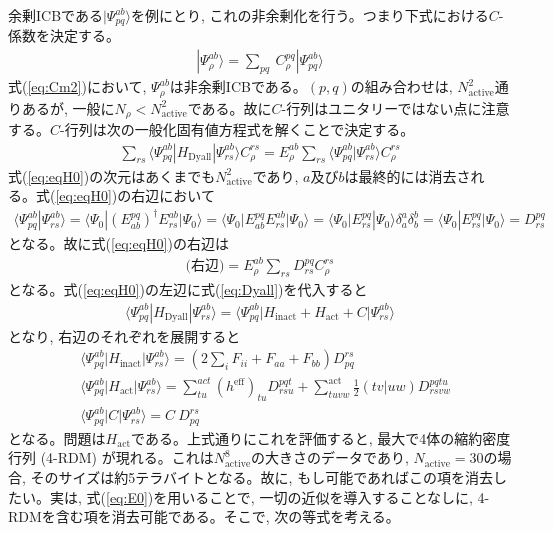 \documentclass[11pt,pra,aps]{revtex4}
\begin{document}
余剰ICBである$|\Psi_{pq}^{ab}\rangle$を例にとり, これの非余剰化を行う。つまり下式における$C$-係数を決定する。
\begin{align}
  |\Psi_{\rho}^{ab}\rangle=\sum_{pq} \ C_{\rho}^{pq} |\Psi_{pq}^{ab}\rangle \label{eq:Cm2}
\end{align}
式(\ref{eq:Cm2})において, $\Psi_{\rho}^{ab}$は非余剰ICBである。$(p,q)$の組み合わせは, $N_\text{active}^2$通りあるが, 一般に$N_\rho<N_\text{active}^2$である。故に$C$-行列はユニタリーではない点に注意する。$C$-行列は次の一般化固有値方程式を解くことで決定する。
\begin{align}
  \sum_{rs} \langle\Psi_{pq}^{ab}|H_\text{Dyall}|\Psi_{rs}^{ab}\rangle C_\rho^{rs}=E_{\rho}^{ab}\sum_{rs} \langle\Psi_{pq}^{ab}|\Psi_{rs}^{ab}\rangle C_\rho^{rs} \label{eq:eqH0}
\end{align}
式(\ref{eq:eqH0})の次元はあくまでも$N_\text{active}^2$であり, $a$及び$b$は最終的には消去される。式(\ref{eq:eqH0})の右辺において
\begin{align}
  \langle\Psi_{pq}^{ab}|\Psi_{rs}^{ab}\rangle = \langle\Psi_0|\left(E^{pq}_{ab}\right)^\dagger E_{rs}^{ab}|\Psi_0\rangle = \langle\Psi_0|E^{pq}_{ab}E_{rs}^{ab}|\Psi_0\rangle = \langle\Psi_0|E^{pq}_{rs}|\Psi_0\rangle \delta_a^a \delta_b^b = \langle\Psi_0|E^{pq}_{rs}|\Psi_0\rangle = D_{rs}^{pq}
\end{align}
となる。故に式(\ref{eq:eqH0})の右辺は
\begin{align}
  \text{(右辺)}=E_\rho^{ab}\sum_{rs} D^{pq}_{rs} C_\rho^{rs}
\end{align}
となる。式(\ref{eq:eqH0})の左辺に式(\ref{eq:Dyall})を代入すると
\begin{align}
  \langle\Psi_{pq}^{ab}|H_\text{Dyall}|\Psi_{rs}^{ab}\rangle = \langle\Psi_{pq}^{ab}|H_\text{inact}+H_\text{act}+C|\Psi_{rs}^{ab}\rangle
\end{align}
となり, 右辺のそれぞれを展開すると
\begin{align}
  &\langle\Psi_{pq}^{ab}|H_\text{inact}|\Psi_{rs}^{ab}\rangle=\left(2\sum_i F_{ii}+F_{aa}+F_{bb}\right)D^{rs}_{pq} \label{eq:inact} \\
  &\langle\Psi_{pq}^{ab}|H_\text{act}  |\Psi_{rs}^{ab}\rangle=\sum_{tu}^{act} (h^\text{eff})_{tu} D^{pqt}_{rsu} + \sum_{tuvw}^\text{act} \frac{1}{2}(tv|uw) D^{pqtu}_{rsvw} \label{eq:nocommH0}\\ 
  &\langle\Psi_{pq}^{ab}|C|\Psi_{rs}^{ab}\rangle=C \ D^{rs}_{pq} \label{eq:C-Dyall}
\end{align}
となる。問題は$H_\text{act}$である。上式通りにこれを評価すると, 最大で4体の縮約密度行列 (4-RDM) が現れる。これは$N_\text{active}^8$の大きさのデータであり, $N_\text{active}=30$の場合, そのサイズは約5テラバイトとなる。故に, もし可能であればこの項を消去したい。実は, 式(\ref{eq:E0})を用いることで, 一切の近似を導入することなしに, 4-RDMを含む項を消去可能である。そこで, 次の等式を考える。
\end{document}
